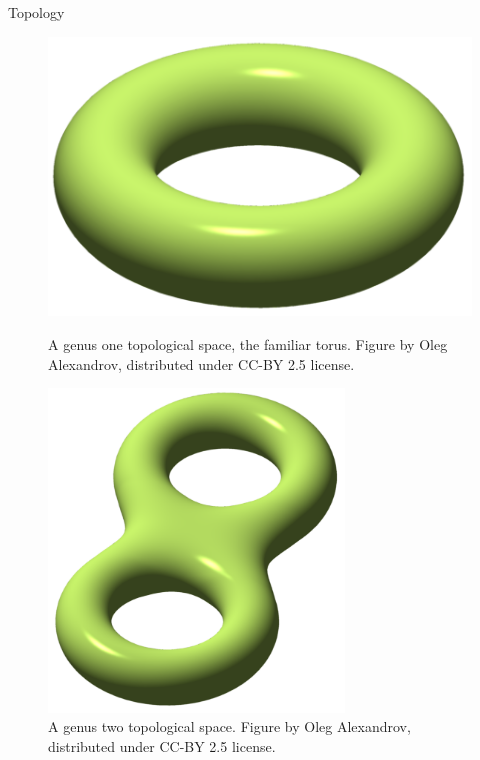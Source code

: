 \documentclass{beamer}
\newlength{\colwidth}
\begin{document}
\begin{frame}[t]
\begin{columns}[t]
\begin{column}{\colwidth}
\begin{block}{Topology}
\bigskip
\begin{figure}[htbp]
    \centering
    \begin{minipage}[b]{0.32\textwidth}
        \centering
        \includegraphics[width=\textwidth]{figures/single_torus.png}
        \caption{A genus one topological space, the familiar torus. Figure by Oleg Alexandrov, distributed under CC-BY 2.5 license.}
        \label{fig:single torus}
    \end{minipage}
    \hfill
    \begin{minipage}[b]{0.32\textwidth}
        \centering
        \includegraphics[width=0.7\textwidth]{figures/double_torus.png}
        \caption{A genus two topological space. Figure by Oleg Alexandrov, distributed under CC-BY 2.5 license.}
        \label{fig:double torus}
    \end{minipage}

\end{figure}
\end{block}
\end{column}
\end{columns}
\end{frame}
\end{document}
